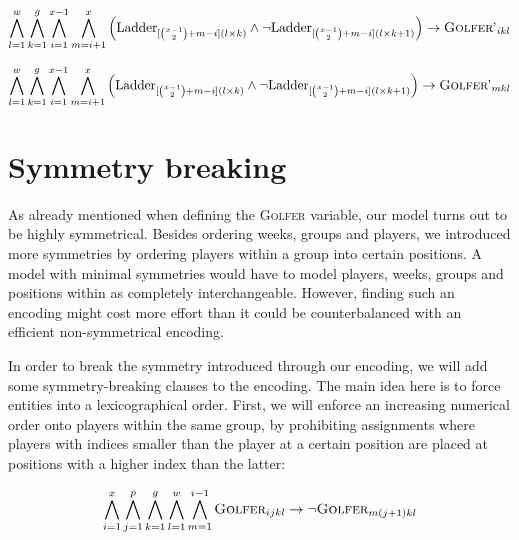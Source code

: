 \documentclass[a4paper]{scrartcl}
\begin{document}
\begin{equation}
\centering
    \bigwedge \limits_{l=1}^{w}
    \bigwedge \limits_{k=1}^{g}
    \bigwedge \limits_{i=1}^{x-1}
    \bigwedge \limits_{m=i+1}^{x}
    \Big(
        \text{Ladder}_{
            [
                {x-1 \choose 2}
                +m-i
            ](l \times k)
        }
        \wedge
        \neg
        \text{Ladder}_{
            [
                {x-1 \choose 2}
                +m-i
            ](l \times k + 1)
        }
    \Big)
    \to
    \textsc{Golfer'}_{ikl}
\end{equation}

\begin{equation}
\centering
    \bigwedge \limits_{l=1}^{w}
    \bigwedge \limits_{k=1}^{g}
    \bigwedge \limits_{i=1}^{x-1}
    \bigwedge \limits_{m=i+1}^{x}
    \Big(
        \text{Ladder}_{
            [
                {x-1 \choose 2}
                +m-i
            ](l \times k)
        }
        \wedge
        \neg
        \text{Ladder}_{
            [
                {x-1 \choose 2}
                +m-i
            ](l \times k + 1)
        }
    \Big)
    \to
    \textsc{Golfer'}_{mkl}
\end{equation}

\section{Symmetry breaking}

As already mentioned when defining the \textsc{Golfer} variable, our model turns out to be highly symmetrical. Besides ordering weeks, groups and players, we introduced more symmetries by ordering players within a group into certain positions. A model with minimal symmetries would have to model players, weeks, groups and positions within as completely interchangeable. However, finding such an encoding might cost more effort than it could be counterbalanced with an efficient non-symmetrical encoding. 

In order to break the symmetry introduced through our encoding, we will add some symmetry-breaking clauses to the encoding. The main idea here is to force entities into a lexicographical order. First, we will enforce an increasing numerical order onto players within the same group, by prohibiting assignments where players with indices smaller than the player at a certain position are placed at positions with a higher index than the latter:

\begin{equation}
\centering
    \bigwedge \limits_{i=1}^x
    \bigwedge \limits_{j=1}^p
    \bigwedge \limits_{k=1}^g
    \bigwedge \limits_{l=1}^w
    \bigwedge \limits_{m=1}^{i-1}
    \textsc{Golfer}_{ijkl}
    \to
    \neg \textsc{Golfer}_{m(j+1)kl}
\end{equation}
\end{document}
